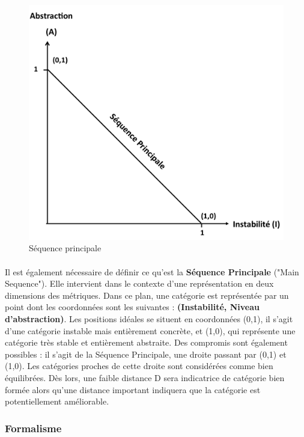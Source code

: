 \documentclass{scrartcl}
\begin{document}
\begin{figure}[h!]
    \centering
    \includegraphics[scale=0.43]{img/MainSequence.png}
    \caption{Séquence principale}
\end{figure}

    \paragraph{}Il est également nécessaire de définir ce qu'est la \textbf{Séquence Principale} ("Main Sequence"). Elle intervient dans le contexte d'une représentation en deux dimensions des métriques. Dans ce plan, une catégorie est représentée par un point dont les coordonnées sont les suivantes : \textbf{(Instabilité, Niveau d'abstraction)}. Les positions idéales se situent en coordonnées (0,1), il s'agit d'une catégorie instable mais entièrement concrète, et (1,0), qui représente une catégorie très stable et entièrement abstraite. Des compromis sont également possibles : il s'agit de la Séquence Principale, une droite passant par (0,1) et (1,0). Les catégories proches de cette droite sont considérées comme bien équilibrées. Dès lors, une faible distance D sera indicatrice de catégorie bien formée alors qu'une distance important indiquera que la catégorie est potentiellement améliorable.
    
\subsubsection{Formalisme}
\label{martin:formalism}
\end{document}
